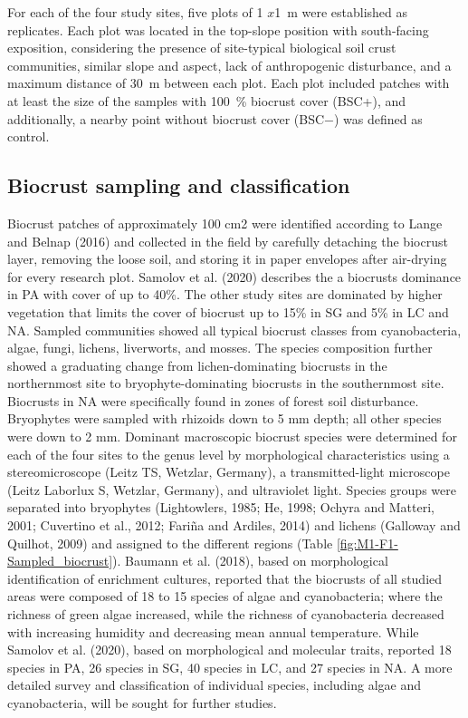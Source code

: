For each of the four study sites, five plots of 1 $x$\SI{1}{\meter} were established as replicates. Each plot was located in the top-slope position with south-facing exposition, considering the presence of site-typical biological soil crust communities, similar slope and aspect, lack of anthropogenic disturbance, and a maximum distance of \SI{30}{\meter} between each plot. Each plot included patches with at least the size of the samples with \SI{100}{\percent} biocrust cover (BSC+), and additionally, a nearby point without biocrust cover (BSC$-$) was defined as control.


\subsection{Biocrust sampling and classification}

Biocrust patches of approximately 100 cm2 were identified according to Lange and Belnap (2016) and collected in the field by carefully detaching the biocrust layer, removing the loose soil, and storing it in paper envelopes after air-drying for every research plot. Samolov et al. (2020) describes the a biocrusts dominance in PA with cover of up to 40\%. The other study sites are dominated by higher vegetation that limits the cover of biocrust up to 15\% in SG and 5\% in LC and NA. Sampled communities showed all typical biocrust classes from cyanobacteria, algae, fungi, lichens, liverworts, and mosses. The species composition further showed a graduating change from lichen-dominating biocrusts in the northernmost site to bryophyte-dominating biocrusts in the southernmost site. Biocrusts in NA were specifically found in zones of forest soil disturbance. Bryophytes were sampled with rhizoids down to 5 mm depth; all other species were down to 2 mm. Dominant macroscopic biocrust species were determined for each of the four sites to the genus level by morphological characteristics using a stereomicroscope (Leitz TS, Wetzlar, Germany), a transmitted-light microscope (Leitz Laborlux S, Wetzlar, Germany), and ultraviolet light. Species groups were separated into bryophytes (Lightowlers, 1985; He, 1998; Ochyra and Matteri, 2001; Cuvertino et al., 2012; Fariña and Ardiles, 2014) and lichens (Galloway and Quilhot, 2009) and assigned to the different regions (Table \ref{fig:M1-F1-Sampled_biocrust}). Baumann et al. (2018), based on morphological identification of enrichment cultures, reported that the biocrusts of all studied areas were composed of 18 to 15 species of algae and cyanobacteria; where the richness of green algae increased, while the richness of cyanobacteria decreased with increasing humidity and decreasing mean annual temperature. While Samolov et al. (2020), based on morphological and molecular traits, reported 18 species in PA, 26 species in SG, 40 species in LC, and 27 species in NA. A more detailed survey and classification of individual species, including algae and cyanobacteria, will be sought for further studies.

